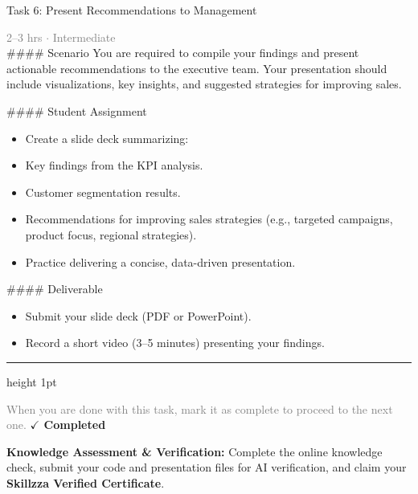 \documentclass[10pt,a4paper]{article}
\begin{document}
\begin{taskbox}{Task 6: Present Recommendations to Management}

    {\small \textcolor{gray}{2--3 hrs $\cdot$ Intermediate}}\\[12pt]

    \#\#\#\# Scenario  
You are required to compile your findings and present actionable recommendations to the executive team. Your presentation should include visualizations, key insights, and suggested strategies for improving sales.  

\#\#\#\# Student Assignment  
\begin{itemize}
    \item Create a slide deck summarizing:  
    \item Key findings from the KPI analysis.  
    \item Customer segmentation results.  
    \item Recommendations for improving sales strategies (e.g., targeted campaigns, product focus, regional strategies).  
    \item Practice delivering a concise, data-driven presentation.  
\end{itemize}

\#\#\#\# Deliverable  
\begin{itemize}
    \item Submit your slide deck (PDF or PowerPoint).  
    \item Record a short video (3–5 minutes) presenting your findings.\par
\end{itemize}

    \vspace{16pt}

    \textcolor{cardBorder}{\hrule height 1pt}\vspace{8pt}

    \small \textcolor{gray}{When you are done with this task, mark it as complete to proceed to the next one.} \hfill \textbf{\textcolor{brandDark}{$\checkmark$ Completed}}

\end{taskbox}

\begin{completionbox}
    \textbf{Knowledge Assessment \& Verification:} Complete the online knowledge check, submit your code and presentation files for AI verification, and claim your \textbf{Skillzza Verified Certificate}.
\end{completionbox}
\end{document}
